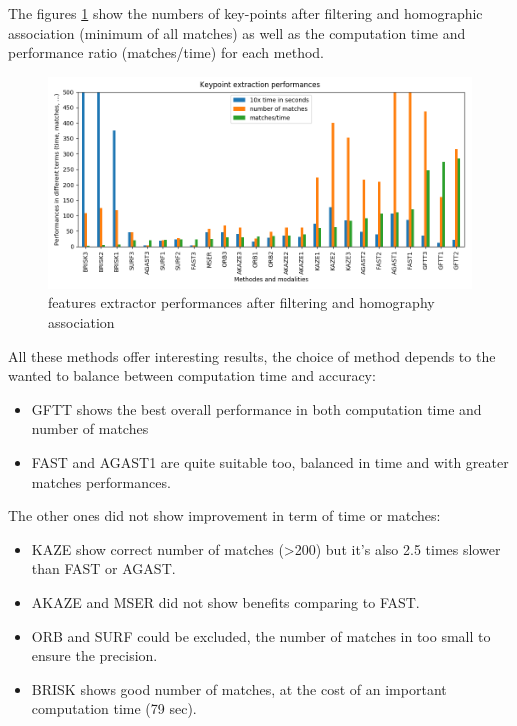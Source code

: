 \documentclass[]{elsarticle}
\begin{document}
	The figures \ref{fig:features-performances} show the numbers of key-points after filtering and homographic association (minimum of all matches)
	as well as the computation time and performance ratio (matches/time) for each method.
	
	\begin{figure}[H]
		\centering
		\includegraphics[width=0.9\linewidth]{../figures/comparaison-keypoint-performances.png}
		\caption{features extractor performances after filtering and homography association}
		\label{fig:features-performances}
	\end{figure}
	
	All these methods offer interesting results, the choice of method depends to the wanted to balance between computation time and accuracy:
	\begin{itemize}
		\item GFTT shows the best overall performance in both computation time and number of matches
		\item FAST and AGAST1 are quite suitable too, balanced in time and with greater matches performances.
	\end{itemize}
	
	\noindent
	The other ones did not show improvement in term of time or matches:
	\begin{itemize}
		\item KAZE show correct number of matches (>200) but it's also 2.5 times slower than FAST or AGAST.
		\item AKAZE and MSER did not show benefits comparing to FAST.
		\item ORB and SURF could be excluded, the number of matches in too small to ensure the precision.
		\item BRISK shows good number of matches, at the cost of an important computation time (79 sec).
	\end{itemize}
	
\end{document}
